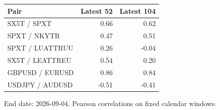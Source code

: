 \par\medskip\noindent
\begin{tabular}{@{}lrr@{}}
\toprule
Pair & Latest 52 & Latest 104\\
\midrule
SX5T / SPXT & 0.66 & 0.62\\
SPXT / NKYTR & 0.47 & 0.51\\
SPXT / LUATTRUU & 0.26 & -0.04\\
SX5T / LEATTREU & 0.54 & 0.20\\
GBPUSD / EURUSD & 0.86 & 0.84\\
USDJPY / AUDUSD & -0.51 & -0.41\\
\bottomrule
\end{tabular}
\par\medskip
\par\medskip\small End date: 2026-09-04. Pearson correlations on fixed calendar windows.
